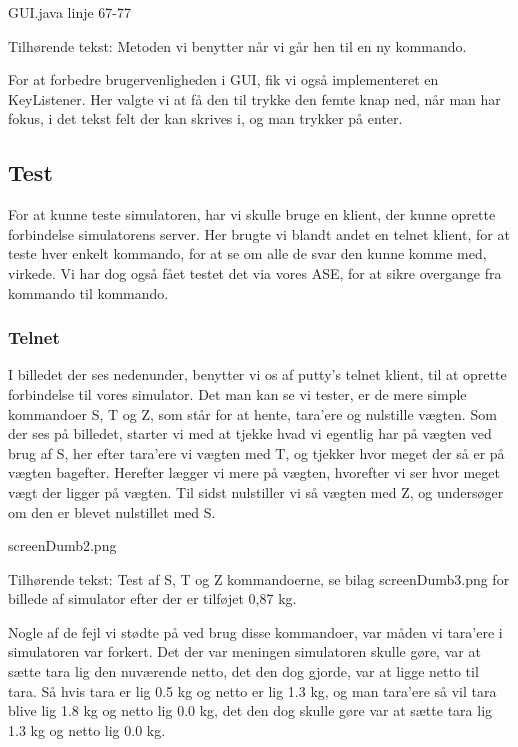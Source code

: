\documentclass[a4paper]{article}
\begin{document}
\begin{center}
GUI.java linje 67-77

Tilhørende tekst: Metoden vi benytter når vi går hen til en ny kommando.
\end{center}

For at forbedre brugervenligheden i GUI, fik vi også implementeret en KeyListener. Her valgte vi at få den til trykke den femte knap ned, når man har fokus, i det tekst felt der kan skrives i, og man trykker på enter.



\subsection{Test} %

For at kunne teste simulatoren, har vi skulle bruge en klient, der kunne oprette forbindelse simulatorens server. Her brugte vi blandt andet en telnet klient, for at teste hver enkelt kommando, for at se om alle de svar den kunne komme med, virkede. Vi har dog også fået testet det via vores ASE, for at sikre overgange fra kommando til kommando.

\subsubsection{Telnet} %

I billedet der ses nedenunder, benytter vi os af putty’s telnet klient, til at oprette forbindelse til vores simulator. Det man kan se vi tester, er de mere simple kommandoer S, T og Z, som står for at hente, tara’ere og nulstille vægten. Som der ses på billedet, starter vi med at tjekke hvad vi egentlig har på vægten ved brug af S, her efter tara’ere vi vægten med T, og tjekker hvor meget der så er på vægten bagefter. Herefter lægger vi mere på vægten, hvorefter vi ser hvor meget vægt der ligger på vægten. Til sidst nulstiller vi så vægten med Z, og undersøger om den er blevet nulstillet med S.

\begin{center}
screenDumb2.png

Tilhørende tekst: Test af S, T og Z kommandoerne, se bilag screenDumb3.png for billede af simulator efter der er tilføjet 0,87 kg.
\end{center}

Nogle af de fejl vi stødte på ved brug disse kommandoer, var måden vi tara’ere i simulatoren var forkert. Det der var meningen simulatoren skulle gøre, var at sætte tara lig den nuværende netto, det den dog gjorde, var at ligge netto til tara. Så hvis tara er lig 0.5 kg og netto er lig 1.3 kg, og man tara’ere så vil tara blive lig 1.8 kg og netto lig 0.0 kg, det den dog skulle gøre var at sætte tara lig 1.3 kg og netto lig 0.0 kg.
\end{document}
